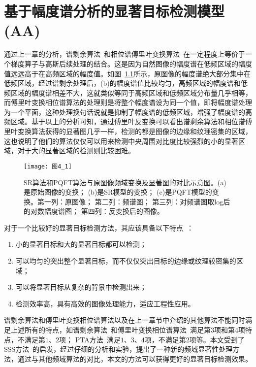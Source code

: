 
\chapter{基于幅度谱分析的显著目标检测模型(AA)}
\label{cha4}

通过上一章的分析，谱剩余算法~\cite{HouXiaodiCVPR2007Residual}和相位谱傅里叶变换算法~\cite{GuoChenleiCVPR2008Spatio}在一定程度上等价于一个梯度算子与高斯后续处理的结合。这是因为自然图像的幅度谱在低频区域的幅度值远远高于在高频区域的幅度值。如图~\ref{图4_1}所示，原图像的幅度谱绝大部分集中在低频区域，经过谱剩余处理后，(b)的幅度谱值比较均匀，高频区域的幅度谱和低频区域的幅度谱相差不大，这就类似等同于高频区域和低频区域分布量几乎相等，而傅里叶变换相位谱算法的处理则是将整个幅度谱设为同一个值，即将幅度谱处理为一个平面，这种处理换句话说就是抑制了幅度谱的低频区域，增强了幅度谱的高频区域。基于以上的分析可知，通过傅里叶反变换可以看出谱剩余算法和相位谱傅里叶变换算法获得的显著图几乎一样，检测的都是图像的边缘和纹理密集的区域，这也说明了他们的算法仅仅可以用来检测中央周围对比度比较强烈的小的显著区域，对于大的显著区域的检测则比较困难。
\begin{figure}[h]
  \centering
  \texttt{[image: 图4\_1]}
  \caption{SR算法和PQFT算法与原图像频域变换及显著图的对比示意图。(a)是原始图像的变换； (b)是SR模型的变换； (c)是PQFT模型的变换。第一列：原图像； 第二列：频谱图； 第三列：对频谱图取log后的对数幅度谱图； 第四列：反变换后的图像。}
  \label{图4_1}    
\end{figure}

对于一个比较好的显著目标检测方法，其应该具备以下特点~\cite{AchantaCVPR2009Frequency}：
\begin{enumerate}
\item 小的显著目标和大的显著目标都可以检测；
\item 可以均匀的突出整个显著目标，而不仅仅突出目标的边缘或纹理较密集的区域；
\item 可以将显著目标从复杂的背景中检测出来；
\item 检测效率高，具有高效的图像处理能力，适应工程性应用。
\end{enumerate}

谱剩余算法和傅里叶变换相位谱算法以及在上一章节中介绍的其他算法不能同时满足上述所有的特点，如谱剩余算法~\cite{HouXiaodiCVPR2007Residual}和傅里叶变换相位谱算法~\cite{GuoChenleiCVPR2008Spatio}满足第$3$项和第$4$项特点，不满足第$1$、$2$项；  PTA方法~\cite{李崇飞2012相位谱}满足$1$、$3$、$4$项，不满足第$2$项等。本文受到了SSS方法~\cite{LiJianTPAMI2013Scale}的启发，经过仔细的分析和实验，提出了一种新的频域显著性处理方法，通过与其他频域算法的对比，本文的方法可以获得更好的显著目标检测效果。

